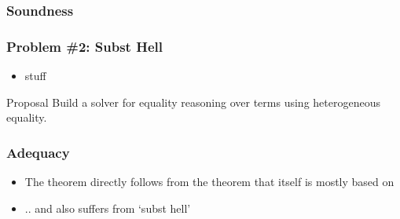 \documentclass[dvipsnames,aspectratio=169,pdftex]{beamer}
\begin{document}
\begin{frame}[fragile]
  \frametitle{Soundness}
  \BigStepSoundnessType
  \SmallStepSoundness
  \vspace{-12.5mm} 
  \SmallStepSoundnessProofExcerpt
\end{frame}

\begin{frame}[fragile]
  \frametitle{Problem \#2: Subst Hell}
  \SubstExamplesFusionTSubTSub
  \SubstExamplesFusionESubESub
  \begin{itemize}
    \item stuff
  \end{itemize}
  \begin{exampleblock}{Proposal}
    Build a solver for equality reasoning over  terms using heterogeneous equality. 
  \end{exampleblock}
\end{frame}

\begin{frame}[fragile]
  \frametitle{Adequacy}
  \FundamentalAdequacyType
  \vspace{-12.5mm} 
  \FundamentalAdequacyBody
  \begin{itemize}
    \item The  theorem directly follows from the  theorem that itself is mostly based on \cite{DBLP:journals/corr/abs-1907-11133,ahmed23:_oplss}
    \item .. and also suffers from `subst hell'
  \end{itemize}
\end{frame}
\end{document}
